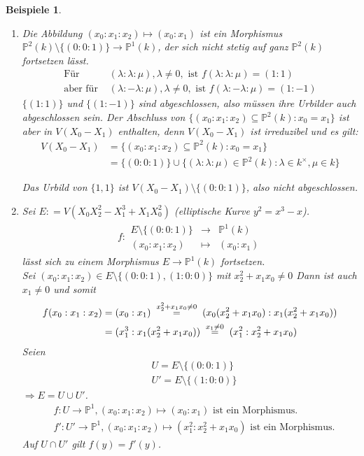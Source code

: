 \documentclass[a4paper,12pt]{report}
\theoremstyle{break}
\theoremstyle{nonumberbreak}
\newtheorem{nnBsp}{Beispiele}
\theoremstyle{nonumberplain}
\newcommand{\defeqr}[0]{\mathrel{\mathop:}=}
\newcommand{\gleichwegen}[1]{\ensuremath{\DOTSB\;\stackrel{#1}{=}\;}}
\newcommand{\Abb}[5]{\ensuremath{#1:\begin{array}{ccc} #2 & \longrightarrow & #3 \\ #4 & \longmapsto & #5 \end{array}}}
\renewcommand{\labelenumi}{\theenumi}
\renewcommand{\theenumi}{(\alph{enumi})}
\begin{document}
\begin{nnBsp}
  \begin{enumerate}
    \renewcommand{\labelenumi}{\arabic{enumi}.)}
  \item Die Abbildung $(x_0:x_1:x_2)\mapsto(x_0:x_1)$ ist ein Morphismus $\mathbb P^2(k)\setminus \{(0:0:1)\}\longrightarrow\mathbb P^1(k)$,
    der sich nicht stetig auf ganz $\mathbb P^2(k)$ fortsetzen lässt.
    \begin{align*}
      \text{Für } &(\lambda:\lambda:\mu),\lambda\neq 0,\text{ ist } f(\lambda:\lambda:\mu)=(1:1) \\
      \text{aber für } &(\lambda:-\lambda:\mu),\lambda\neq 0,\text{ ist } f(\lambda:-\lambda:\mu)=(1:-1)
    \end{align*}
    $\{(1:1)\}$ und $\{(1:-1)\}$ sind abgeschlossen, also müssen ihre Urbilder auch abgeschlossen sein.
    Der Abschluss von $\{(x_0:x_1:x_2)\subseteq\mathbb P^2(k):x_0=x_1\}$ ist aber in $V(X_0-X_1)$ enthalten, 
    denn $V(X_0-X_1)$ ist irreduzibel und es gilt:
    \begin{align*}
      V(X_0-X_1)&=\{(x_0:x_1:x_2)\subseteq\mathbb P^2(k):x_0=x_1\} \\
      &=\{(0:0:1)\}\cup\{(\lambda:\lambda:\mu)\in\mathbb P^2(k):\lambda\in k^\times,\mu\in k\}
    \end{align*}

Das Urbild von $\{1,1\}$ ist $V(X_0-X_1)\setminus\{(0:0:1)\}$, also nicht abgeschlossen.

  \item Sei $E\defeqr V(X_0X_2^2-X_1^3+X_1X_0^2)$ (elliptische Kurve $y^2=x^3-x$). \\
    \begin{align*}
    \Abb{f}{E\setminus\{(0:0:1)\}}{\mathbb P^1(k)}{(x_0:x_1:x_2)}{(x_0:x_1)}      
    \end{align*}
    lässt sich zu einem Morphismus $E\longrightarrow\mathbb P^1(k)$ fortsetzen.\\
Sei $(x_0:x_1:x_2)\in E\setminus \{(0:0:1),(1:0:0)\}$ mit $x^2_2+x_1x_0\neq 0$ Dann ist auch $x_1\neq 0$ und somit
    \begin{align*}
      f(x_0:x_1:x_2)&=(x_0:x_1)\gleichwegen{x_2^2+x_1x_0\neq0}(x_0(x_2^2+x_1x_0):x_1(x_2^2+x_1x_0)) \\
      &=(x_1^3:x_1(x_2^2+x_1x_0))\gleichwegen{x_1\neq0}(x_1^2:x_2^2+x_1x_0)
    \end{align*}
    Seien
    \begin{align*}
      &U =E\setminus\{(0:0:1)\} \\
      &U'=E\setminus\{(1:0:0)\}
    \end{align*}
    $\Rightarrow E=U\cup U'$.
    \begin{align*}
      &f:U\longrightarrow\mathbb P^1, (x_0:x_1:x_2)\mapsto(x_0:x_1) \text{ ist ein Morphismus.} \\
      &f':U'\longrightarrow\mathbb P^1, (x_0:x_1:x_2)\mapsto(x_1^2:x_2^2+x_1x_0) \text{ ist ein Morphismus.}
    \end{align*}
    Auf $U\cap U'$ gilt $f(y)=f'(y)$.
  \end{enumerate}
\end{nnBsp}
\end{document}
